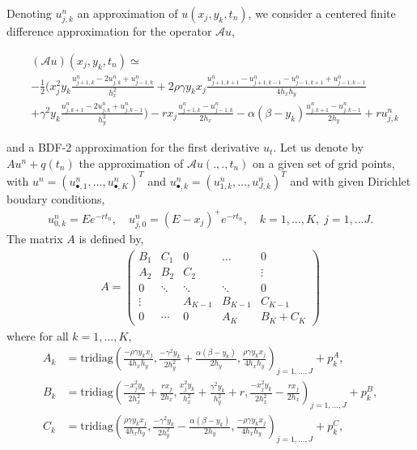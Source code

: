 \documentclass[12pt,a4paper]{article}
\begin{document}
Denoting $u_{j,k}^n$ an approximation of $u(x_j,y_k,t_n)$, we consider a centered finite difference approximation for the operator $\mathcal{A}u$,
\begin{footnotesize}
\begin{align*}
	&(\mathcal{A}u)(x_j,y_k,t_n) \simeq \\
	&-\frac{1}{2} \bigg( x_j^2 y_k \frac{u_{j+1,k}^n - 2u_{j,k}^n + u_{j-1,k}^n}{h_x^2} 
	 +2 \rho \gamma y_k x_j \frac{u_{j+1,k+1}^n - u_{j+1,k-1}^n - u_{j-1,k+1}^n + u_{j-1,k-1}^n}{4 h_x h_y} \\ 
	&+ \gamma^2 y_k \frac{u_{j,k+1}^n - 2 u_{j,k}^n + u_{j,k-1}^n}{h_y^2} \bigg) - r x_j \frac{u_{j+1,k}^n-u_{j-1,k}^n}{2h_x} - \alpha (\beta - y_k) \frac{u_{j,k+1}^n - u_{j,k-1}^n}{2 h_y} + ru_{j,k}^n
\end{align*}
\end{footnotesize}
and a BDF-2 approximation for the first derivative $u_t$. Let us denote by $A u^n + q(t_n)$ the approximation of $\mathcal{A}u(.,.,t_n)$ on a given set of grid points, with $u^n = (u_{\bullet,1}^n,\dots,u_{\bullet,K}^n)^T$ and $u_{\bullet,k}^n = (u_{1,k}^n,\dots,u_{J,k}^n)^T$ and with given Dirichlet boudary conditions,
\begin{align*}
u_{0,k}^n = E e^{-r t_n}, \quad u_{j,0}^n = (E-x_j)^+ e^{-r t_n}, \quad k=1,\dots,K, \; j=1,\dots J.
\end{align*}
The matrix $A$ is defined by,
\begin{align*}
A = \begin{pmatrix}
   B_1 & C_1 & 0 & \hdots & 0 \\
   A_2 & B_2 & C_2 & & \vdots \\
   0 & \ddots & \ddots & \ddots & 0 \\
   \vdots & & A_{K-1} & B _{K-1} & C_{K-1} \\
   0 & \cdots & 0 & A_K & B_K + C_K
\end{pmatrix}
\end{align*}
where for all $k = 1, \dots, K$,
\begin{align*}
	A_k	&= \text{tridiag} \left( \frac{-\rho \gamma y_k x_j}{4 h_x h_y}, \frac{-\gamma^2 y_k}{2 h_y^2} + \frac{\alpha (\beta - y_k)}{2 h_y}, \frac{\rho \gamma y_k x_j}{4 h_x h_y} \right)_{j=1,\dots,J} + p^A_k, \\
	B_k &= \text{tridiag} \left( \frac{-x_j^2 y_k}{2h_x^2} + \frac{r x_j}{2 h_x}, \frac{x_j^2 y_k}{h_x^2} + \frac{\gamma^2 y_k}{h_y^2} + r, \frac{-x_j^2 y_k}{2 h_x^2} - \frac{r x_j}{2 h_x} \right)_{j=1,\dots,J} + p^B_k, \\
	C_k &= \text{tridiag} \left( \frac{\rho \gamma y_k x_j}{4 h_x h_y}, \frac{-\gamma^2 y_k}{2 h_y^2} - \frac{\alpha (\beta - y_k)}{2 h_y}, \frac{-\rho \gamma y_k x_j}{4 h_x h_y} \right)_{j=1,\dots,J} + p^C_k,
\end{align*}
\end{document}
